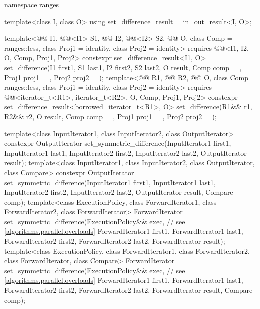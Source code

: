 \begin{codeblock}
{  namespace ranges {
    template<class I, class O>
      using set_difference_result = in_out_result<I, O>;

    template<@@ I1, @@<I1> S1, @@ I2, @@<I2> S2,
             @@ O, class Comp = ranges::less,
             class Proj1 = identity, class Proj2 = identity>
      requires @@<I1, I2, O, Comp, Proj1, Proj2>
      constexpr set_difference_result<I1, O>
        set_difference(I1 first1, S1 last1, I2 first2, S2 last2, O result,
                       Comp comp = {}, Proj1 proj1 = {}, Proj2 proj2 = {});
    template<@@ R1, @@ R2, @@ O,
             class Comp = ranges::less, class Proj1 = identity, class Proj2 = identity>
      requires @@<iterator_t<R1>, iterator_t<R2>, O, Comp, Proj1, Proj2>
      constexpr set_difference_result<borrowed_iterator_t<R1>, O>
        set_difference(R1&& r1, R2&& r2, O result,
                       Comp comp = {}, Proj1 proj1 = {}, Proj2 proj2 = {});
  }

  template<class InputIterator1, class InputIterator2, class OutputIterator>
    constexpr OutputIterator
      set_symmetric_difference(InputIterator1 first1, InputIterator1 last1,
                               InputIterator2 first2, InputIterator2 last2,
                               OutputIterator result);
  template<class InputIterator1, class InputIterator2, class OutputIterator, class Compare>
    constexpr OutputIterator
      set_symmetric_difference(InputIterator1 first1, InputIterator1 last1,
                               InputIterator2 first2, InputIterator2 last2,
                               OutputIterator result, Compare comp);
  template<class ExecutionPolicy, class ForwardIterator1, class ForwardIterator2,
           class ForwardIterator>
    ForwardIterator
      set_symmetric_difference(ExecutionPolicy&& exec,          // see \ref{algorithms.parallel.overloads}
                               ForwardIterator1 first1, ForwardIterator1 last1,
                               ForwardIterator2 first2, ForwardIterator2 last2,
                               ForwardIterator result);
  template<class ExecutionPolicy, class ForwardIterator1, class ForwardIterator2,
           class ForwardIterator, class Compare>
    ForwardIterator
      set_symmetric_difference(ExecutionPolicy&& exec,          // see \ref{algorithms.parallel.overloads}
                               ForwardIterator1 first1, ForwardIterator1 last1,
                               ForwardIterator2 first2, ForwardIterator2 last2,
                               ForwardIterator result, Compare comp);

}
\end{codeblock}
